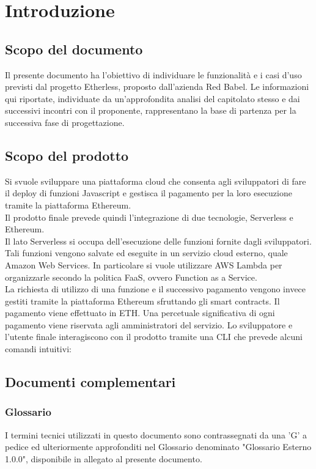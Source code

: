 \section{Introduzione}
\subsection{Scopo del documento}
Il presente documento ha l'obiettivo di individuare le funzionalità e i casi d'uso previsti dal progetto Etherless, proposto dall'azienda Red Babel. Le informazioni qui riportate, individuate da un'approfondita analisi del capitolato stesso e dai successivi incontri con il proponente, rappresentano la base di partenza per la successiva fase di progettazione.
\subsection{Scopo del prodotto}
Si svuole sviluppare una piattaforma cloud che consenta agli sviluppatori di fare il deploy di funzioni Javascript e gestisca il pagamento per la loro esecuzione tramite la piattaforma Ethereum.\\
Il prodotto finale prevede quindi l'integrazione di due tecnologie, Serverless e Ethereum.\\
Il lato Serverless si occupa dell'esecuzione delle funzioni fornite dagli sviluppatori. Tali funzioni vengono salvate ed eseguite in un servizio cloud esterno, quale Amazon Web Services. In particolare si vuole utilizzare AWS Lambda per organizzarle secondo la politica FaaS, ovvero Function as a Service. \\La richiesta di utilizzo di una funzione e il successivo pagamento vengono invece gestiti tramite la piattaforma Ethereum sfruttando gli smart contracts. Il pagamento viene effettuato in ETH. Una percetuale significativa di ogni pagamento viene riservata agli amministratori del servizio. 
Lo sviluppatore e l'utente finale interagiscono con il prodotto tramite una CLI che prevede alcuni comandi intuitivi:
\subsection{Documenti complementari}
\subsubsection{Glossario}
	I termini tecnici utilizzati in questo documento sono contrassegnati da una ’G’ a pedice ed ulteriormente approfonditi nel Glossario denominato "Glossario Esterno 1.0.0", disponibile in allegato al presente documento.
